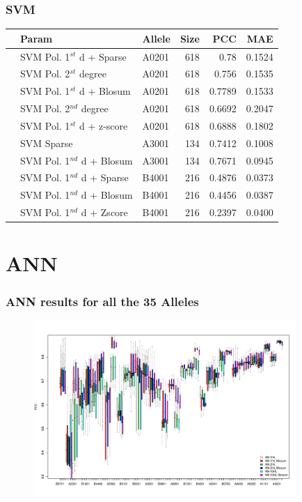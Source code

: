 \documentclass[presentation]{beamer}   %
\begin{document}
\begin{frame} 
 \frametitle{SVM}
\begin{table}[ht]\scriptsize
\begin{center}
\begin{tabular}{rllrrr}
  \hline
 & Param & Allele & Size & PCC & MAE \\ 
  \hline
 & SVM Pol. 1$^{st}$ d + Sparse & A0201 &   618 & 0.78 & 0.1524 \\ 
 & SVM Pol. 2$^{st}$ degree & A0201 &   618 & 0.756 & 0.1535 \\ 
 & SVM Pol. 1$^{st}$ d + Blosum & A0201 &   618 & 0.7789 & 0.1533 \\ 
 & SVM Pol. 2$^{nd}$ degree & A0201 &   618 & 0.6692 & 0.2047 \\ 
 & SVM Pol. 1$^{st}$ d + z-score & A0201 &   618 & 0.6888 & 0.1802 \\ 
 & SVM Sparse & A3001 &   134 & 0.7412 & 0.1008 \\ 
 & SVM Pol. 1$^{nd}$ d + Blosum & A3001 &   134 & 0.7671 & 0.0945 \\ 
 & SVM Pol. 1$^{nd}$ d + Sparse & B4001 &   216 & 0.4876 & 0.0373 \\ 
 & SVM Pol. 1$^{nd}$ d + Blosum & B4001 &   216 & 0.4456 & 0.0387 \\ 
 & SVM Pol. 1$^{nd}$ d + Zscore & B4001 &   216 & 0.2397 & 0.0400 \\ 
   \hline
\end{tabular}
\end{center}
\end{table}

\end{frame}

\section{ANN}

\begin{frame}
\frametitle{ANN results for all the 35 Alleles}
\begin{figure}[ht]
\begin{center}
\includegraphics[width=10cm]{fig/annBX1.pdf}
\end{center}
\end{figure}
\end{frame}
\end{document}
